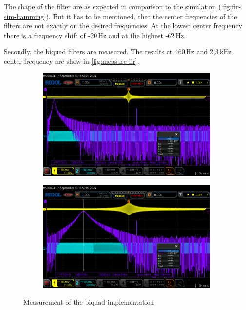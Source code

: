The shape of the filter are as expected in comparison to the simulation (\autoref{fig:fir-sim-hamming}).
But it has to be mentioned, that the center frequencies of the filters are not exactly on the desired
frequencies. At the lowest center frequency there is a frequency shift of -20\,Hz and at the highest
-62\,Hz.

Secondly, the biquad filters are measured. The results at 460\,Hz and 2,3\,kHz center frequency are show in
\autoref{fig:measure-iir}.

\begin{figure}[!h]
    \centering
    \begin{subfigure}[c]{0.49\textwidth}
        \centering
        \includegraphics[width=\textwidth]{img/iir_measure_460.png}
    \end{subfigure}
    \begin{subfigure}[c]{0.49\textwidth}
        \centering
        \includegraphics[width=\textwidth]{img/iir_measure_2300.png}
    \end{subfigure}
    \caption{Measurement of the biquad-implementation}
    \label{fig:measure-iir}
\end{figure}

